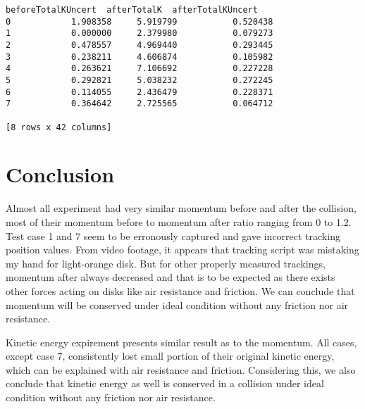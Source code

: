 \documentclass[11pt]{article}
\begin{document}
\begin{tcolorbox}[breakable, size=fbox, boxrule=.5pt, pad at break*=1mm, opacityfill=0]
\begin{Verbatim}[commandchars=\\\{\}]
   beforeTotalKUncert  afterTotalK  afterTotalKUncert
0            1.908358     5.919799           0.520438
1            0.000000     2.379980           0.079273
2            0.478557     4.969440           0.293445
3            0.238211     4.606874           0.105982
4            0.263621     7.106692           0.227228
5            0.292821     5.038232           0.272245
6            0.114055     2.436479           0.228371
7            0.364642     2.725565           0.064712

[8 rows x 42 columns]
\end{Verbatim}
\end{tcolorbox}
        
    \hypertarget{conclusion}{%
\section{Conclusion}\label{conclusion}}

Almost all experiment had very similar momentum before and after the
collision, most of their momentum before to momentum after ratio ranging
from 0 to 1.2. Test case 1 and 7 seem to be erronously captured and gave
incorrect tracking position values. From video footage, it appears that
tracking script was mistaking my hand for light-orange disk. But for
other properly measured trackings, momentum after always decreased and
that is to be expected as there exists other forces acting on disks like
air resistance and friction. We can conclude that momentum will be
conserved under ideal condition without any friction nor air resistance.

Kinetic energy expirement presents similar result as to the momentum.
All cases, except case 7, consistently lost small portion of their
original kinetic energy, which can be explained with air resistance and
friction. Considering this, we also conclude that kinetic energy as well
is conserved in a collision under ideal condition without any friction
nor air resistance.


    
    
    
\end{document}
